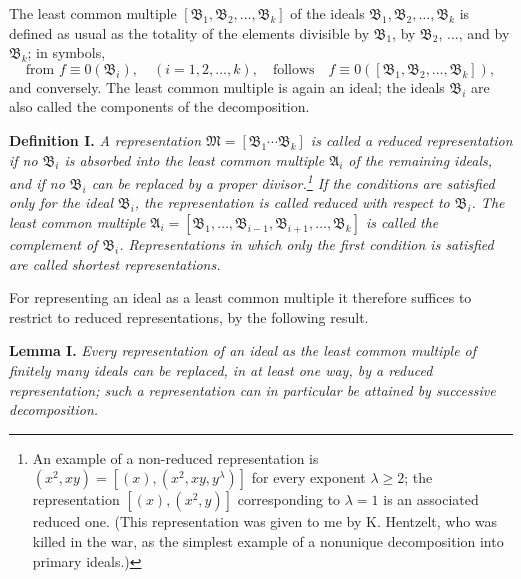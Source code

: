 \documentclass[11pt]{article}
\providecommand{\ideal}[1]{\mathfrak{#1}}
\begin{document}
The least common multiple $[\ideal B_1,\ideal B_2,\ldots,\ideal B_k]$ of the ideals $\ideal B_1,\ideal B_2,\ldots,\ideal B_k$ is defined as usual as the totality of the elements divisible by $\ideal B_1$, by $\ideal B_2$, $\ldots$, and by $\ideal B_k$; in symbols,
\[
 \text{from } f\equiv0(\ideal B_i),\quad (i=1,2,\ldots,k),
 \quad\text{follows}\quad
 f\equiv0([\ideal B_1,\ideal B_2,\ldots,\ideal B_k]),
\]
and conversely. The least common multiple is again an ideal; the ideals $\ideal B_i$ are also called the components of the decomposition.

\textbf{Definition I.} \emph{A representation $\ideal M=[\ideal B_1\cdots\ideal B_k]$ is called a reduced representation if no $\ideal B_i$ is absorbed into the least common multiple $\ideal A_i$ of the remaining ideals, and if no $\ideal B_i$ can be replaced by a proper divisor.\footnote{An example of a non-reduced representation is $(x^2,xy)=[(x),(x^2,xy,y^\lambda)]$ for every exponent $\lambda\ge2$; the representation $[(x),(x^2,y)]$ corresponding to $\lambda=1$ is an associated reduced one. (This representation was given to me by K. Hentzelt, who was killed in the war, as the simplest example of a nonunique decomposition into primary ideals.)} If the conditions are satisfied only for the ideal $\ideal B_i$, the representation is called reduced with respect to $\ideal B_i$. The least common multiple $\ideal A_i=[\ideal B_1,\ldots,\ideal B_{i-1},\ideal B_{i+1},\ldots,\ideal B_k]$ is called the complement of $\ideal B_i$. Representations in which only the first condition is satisfied are called shortest representations.}

For representing an ideal as a least common multiple it therefore suffices to restrict to reduced representations, by the following result.

\textbf{Lemma I.} \emph{Every representation of an ideal as the least common multiple of finitely many ideals can be replaced, in at least one way, by a reduced representation; such a representation can in particular be attained by successive decomposition.}
\end{document}
